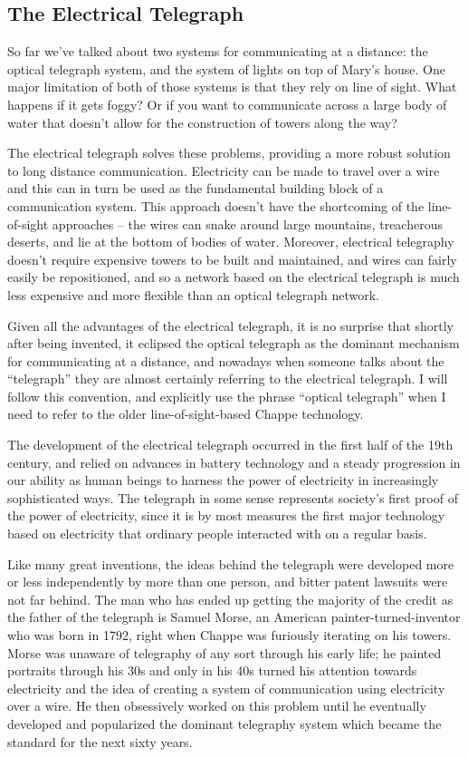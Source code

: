\documentclass[UTF8]{book}
\begin{document}
\begin{CJK}{UTF8}{gbsn}
\chapter{The Electrical Telegraph}

So far we've talked about two systems for communicating at a distance: the optical telegraph system, and the system of lights on top of Mary's house. One major limitation of both of those systems is that they rely on line of sight. What happens if it gets foggy? Or if you want to communicate across a large body of water that doesn't allow for the construction of towers along the way?

The electrical telegraph solves these problems, providing a more robust solution to long distance communication. Electricity can be made to travel over a wire and this can in turn be used as the fundamental building block of a communication system. This approach doesn't have the shortcoming of the line-of-sight approaches – the wires can snake around large mountains, treacherous deserts, and lie at the bottom of bodies of water. Moreover, electrical telegraphy doesn't require expensive towers to be built and maintained, and wires can fairly easily be repositioned, and so a network based on the electrical telegraph is much less expensive and more flexible than an optical telegraph network.

Given all the advantages of the electrical telegraph, it is no surprise that shortly after being invented, it eclipsed the optical telegraph as the dominant mechanism for communicating at a distance, and nowadays when someone talks about the ``telegraph'' they are almost certainly referring to the electrical telegraph. I will follow this convention, and explicitly use the phrase ``optical telegraph'' when I need to refer to the older line-of-sight-based Chappe technology.

The development of the electrical telegraph occurred in the first half of the 19th century, and relied on advances in battery technology and a steady progression in our ability as human beings to harness the power of electricity in increasingly sophisticated ways. The telegraph in some sense represents society's first proof of the power of electricity, since it is by most measures the first major technology based on electricity that ordinary people interacted with on a regular basis.

Like many great inventions, the ideas behind the telegraph were developed more or less independently by more than one person, and bitter patent lawsuits were not far behind. The man who has ended up getting the majority of the credit as the father of the telegraph is Samuel Morse, an American painter-turned-inventor who was born in 1792, right when Chappe was furiously iterating on his towers. Morse was unaware of telegraphy of any sort through his early life; he painted portraits through his 30s and only in his 40s turned his attention towards electricity and the idea of creating a system of communication using electricity over a wire. He then obsessively worked on this problem until he eventually developed and popularized the dominant telegraphy system which became the standard for the next sixty years.


\end{CJK}
\end{document}
